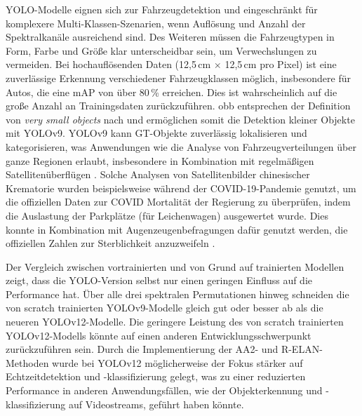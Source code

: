 YOLO-Modelle eignen sich zur Fahrzeugdetektion und eingeschränkt für komplexere Multi-Klassen-Szenarien, wenn Auflösung und Anzahl der Spektralkanäle ausreichend sind. Des Weiteren müssen die Fahrzeugtypen in Form, Farbe und Größe klar unterscheidbar sein, um Verwechslungen zu vermeiden. Bei hochauflösenden Daten (12,5\,cm $\times$ 12,5\,cm pro Pixel) ist eine zuverlässige Erkennung verschiedener Fahrzeugklassen möglich, insbesondere für Autos, die eine mAP von über 80\,\% erreichen. Dies ist wahrscheinlich auf die große Anzahl an Trainingsdaten zurückzuführen. \acrshort{obb} entsprechen der Definition von \textit{very small objects} nach \citeauthor{Chen2017} \cite{Chen2017} und ermöglichen somit die Detektion kleiner Objekte mit \acrshort{YOLO}v9.  \acrshort{YOLO}v9 kann \Acrlong{GT}-Objekte zuverlässig lokalisieren und kategorisieren, was Anwendungen wie die Analyse von Fahrzeugverteilungen über ganze Regionen erlaubt, insbesondere in Kombination mit regelmäßigen Satellitenüberflügen \cite{planet_labs, airbus_neo}. Solche Analysen von Satellitenbilder chinesischer Krematorie wurden beispielsweise während der COVID-19-Pandemie genutzt, um die offiziellen Daten zur COVID Mortalität der Regierung zu überprüfen, indem die Auslastung der Parkplätze (für Leichenwagen) ausgewertet wurde. Dies konnte in Kombination mit Augenzeugenbefragungen dafür genutzt werden, die offiziellen Zahlen zur Sterblichkeit anzuzweifeln \cite{Spiegel_article}.  


Der Vergleich zwischen vortrainierten und von Grund auf trainierten Modellen zeigt, dass die \acrshort{YOLO}-Version selbst nur einen geringen Einfluss auf die Performance hat. Über alle drei spektralen Permutationen hinweg schneiden die von scratch trainierten \acrshort{YOLO}v9-Modelle gleich gut oder besser ab als die neueren YOLOv12-Modelle. Die geringere Leistung des von scratch trainierten \acrshort{YOLO}v12-Modells könnte auf einen anderen Entwicklungsschwerpunkt zurückzuführen sein. Durch die Implementierung der \acrshort{AA2}- und \acrshort{R-ELAN}-Methoden wurde bei \acrshort{YOLO}v12 möglicherweise der Fokus stärker auf Echtzeitdetektion und -klassifizierung gelegt, was zu einer reduzierten Performance in anderen Anwendungsfällen, wie der Objekterkennung und -klassifizierung auf Videostreams, geführt haben könnte.

